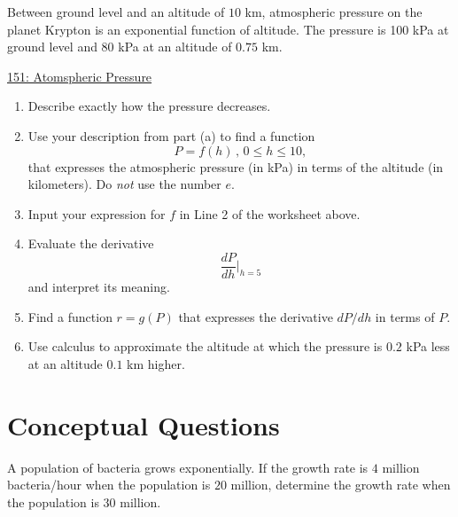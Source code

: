 \documentclass{ximera}
\begin{document}
\begin{question}  \label{Qgfhhfhdffv}
Between ground level and an altitude of $10$ km, atmospheric pressure on the planet Krypton is an exponential function of altitude. The pressure is 100 kPa at ground level and 80 kPa at an altitude of $0.75$ km.

\begin{onlineOnly}
    \begin{center}
\end{center}
\end{onlineOnly}

\href{https://www.desmos.com/calculator/j5h8kaj8xs}{151: Atomspheric Pressure}

\begin{enumerate}
\item Describe exactly how the pressure decreases.

\item Use your description from part (a) to find a function
\[
         P = f(h) \, , \, 0\leq h \leq 10 ,
\]
that expresses the atmospheric pressure (in kPa) in terms of the altitude (in kilometers). Do \emph{not} use the number $e$.

\item Input your expression for $f$ in Line 2 of the worksheet above.

\item Evaluate the derivative 
\[
       \frac{dP}{dh}\Big|_{h=5}
\]
and interpret its meaning.

\item Find a function $r=g(P)$ that expresses the derivative $dP/dh$ in terms of $P$.

\item Use calculus to approximate the altitude at which the pressure is $0.2$ kPa less at an altitude $0.1$ km higher.

\end{enumerate}
  
\end{question}


\section{Conceptual Questions}

\begin{question} \label{QdfadREGLER}
 A population of bacteria grows exponentially. If the growth rate is $4$ million bacteria/hour when the population is $20$ million, determine the growth rate when the population is $30$ million.

\end{question}
\end{document}
